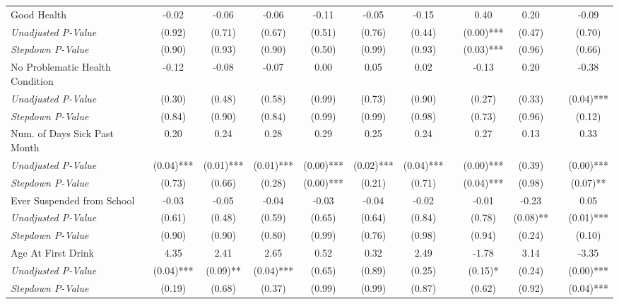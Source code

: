 \begin{tabular}{l c c c c c c c c c c c}
Good Health & -0.02 & -0.06 & -0.06 & -0.11 & -0.05 & -0.15 & & 0.40 & 0.20 & & -0.09 \\
\quad \textit{Unadjusted P-Value} & (0.92) & (0.71) & (0.67) & (0.51) & (0.76) & (0.44) & & (0.00)*** & (0.47) & & (0.70) \\
\quad \textit{Stepdown P-Value} & (0.90) & (0.93) & (0.90) & (0.50) & (0.99) & (0.93) & & (0.03)*** & (0.96) & & (0.66) \\
No Problematic Health Condition & -0.12 & -0.08 & -0.07 & 0.00 & 0.05 & 0.02 & & -0.13 & 0.20 & & -0.38 \\
\quad \textit{Unadjusted P-Value} & (0.30) & (0.48) & (0.58) & (0.99) & (0.73) & (0.90) & & (0.27) & (0.33) & & (0.04)*** \\
\quad \textit{Stepdown P-Value} & (0.84) & (0.90) & (0.84) & (0.99) & (0.99) & (0.98) & & (0.73) & (0.96) & & (0.12) \\
Num. of Days Sick Past Month & 0.20 & 0.24 & 0.28 & 0.29 & 0.25 & 0.24 & & 0.27 & 0.13 & & 0.33 \\
\quad \textit{Unadjusted P-Value} & (0.04)*** & (0.01)*** & (0.01)*** & (0.00)*** & (0.02)*** & (0.04)*** & & (0.00)*** & (0.39) & & (0.00)*** \\
\quad \textit{Stepdown P-Value} & (0.73) & (0.66) & (0.28) & (0.00)*** & (0.21) & (0.71) & & (0.04)*** & (0.98) & & (0.07)** \\
Ever Suspended from School & -0.03 & -0.05 & -0.04 & -0.03 & -0.04 & -0.02 & & -0.01 & -0.23 & & 0.05 \\
\quad \textit{Unadjusted P-Value} & (0.61) & (0.48) & (0.59) & (0.65) & (0.64) & (0.84) & & (0.78) & (0.08)** & & (0.01)*** \\
\quad \textit{Stepdown P-Value} & (0.90) & (0.90) & (0.80) & (0.99) & (0.76) & (0.98) & & (0.94) & (0.24) & & (0.10) \\
Age At First Drink & 4.35 & 2.41 & 2.65 & 0.52 & 0.32 & 2.49 & & -1.78 & 3.14 & & -3.35 \\
\quad \textit{Unadjusted P-Value} & (0.04)*** & (0.09)** & (0.04)*** & (0.65) & (0.89) & (0.25) & & (0.15)* & (0.24) & & (0.00)*** \\
\quad \textit{Stepdown P-Value} & (0.19) & (0.68) & (0.37) & (0.99) & (0.99) & (0.87) & & (0.62) & (0.92) & & (0.04)*** \\
\bottomrule
\end{tabular}

